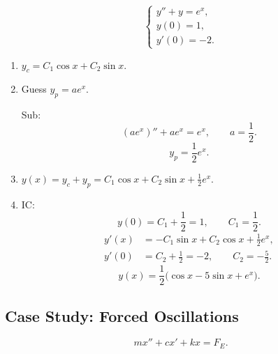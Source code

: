 \begin{example}
  \[
    \begin{cases}
      y''+y=e^x, \\
      y(0)=1,    \\
      y'(0)=-2.
    \end{cases}
  \]
  \begin{enumerate}
    \item $y_c=C_1\cos x+C_2\sin x$.
    \item Guess $y_p=ae^x$.

          Sub:
          \[
            (ae^x)''+ae^x=e^x,\qquad a=\frac12.
          \]
          \[
            y_p=\frac12e^x.
          \]
    \item $y(x)=y_c+y_p=C_1\cos x+C_2\sin x+\frac12e^x$.
    \item IC:
          \[
            y(0)=C_1+\frac12=1,\qquad C_1=\frac12.
          \]
          \begin{align*}
            y'(x) & =-C_1\sin x+C_2\cos x+\frac12e^x,    \\
            y'(0) & =C_2+\frac12=-2,\qquad C_2=-\frac52.
          \end{align*}
          \[
            y(x)=\frac12\bigl(\cos x-5\sin x+e^x\bigr).
          \]
  \end{enumerate}
\end{example}

\subsection{Case Study: Forced Oscillations}

\[
  mx''+cx'+kx=F_E.
\]

